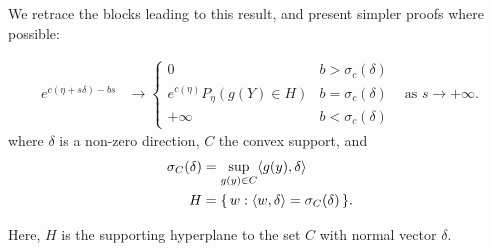 We retrace the blocks leading to this result, and present simpler proofs where possible:
\begin{theorem}\label{Thm:e_c}
\begin{align*}
e^{c(\eta + s \delta) - bs} &\to 
		\begin{cases} 
			0 									& b > \sigma_c(\delta) \\
			e^{c(\eta)} P_\eta(g(Y) \in H ) 		& b = \sigma_c(\delta) \\
			+\infty								& b < \sigma_c(\delta)
		\end{cases}
& \text{as } s \to +\infty.
\end{align*}
where $\delta$ is a non-zero direction, $C$ the convex support, and
\begin{align*}
	\sigma_C (\delta) &= \sup_{g(y) \in C} \langle  g(y), \delta \rangle \\
	H &= \{\, w: \langle w, \delta \rangle = \sigma_C(\delta)  \,\}.
\end{align*}
\end{theorem}
Here, $H$ is the supporting hyperplane to the set $C$ with normal vector $\delta$.

